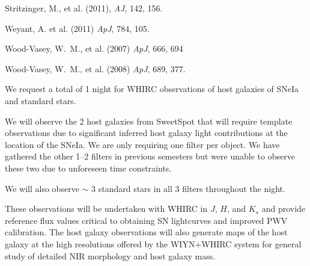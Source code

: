 \documentclass[11pt]{article}
\begin{document}
\begin{thebibliography}{11}


{Stritzinger}, M., et al. (2011), {\it AJ}, 142, 156.


Weyant, A. et al. (2011) {\it ApJ}, 784, 105.

{Wood-Vasey}, W.~M., et al. (2007) {\it ApJ}, 666, 694

Wood-Vasey, W.~M., et al. (2008) {\it ApJ}, 689, 377.



\end{thebibliography}

\clearpage


%

%

\expdesign

We request a total of 1 night for WHIRC observations of host galaxies of SNeIa and standard stars.  

We will observe the 2 host galaxies from SweetSpot that will
require template observations due to significant inferred host galaxy light contributions at the location of the SNeIa.
We are only requiring one filter per object. 
We have gathered the other 1--2 filters in previous semesters but were unable to observe these two due to unforeseen time constraints. 

We will also observe $\sim$ 3 standard stars in all 3 filters throughout the night.

These observations will be undertaken with WHIRC in $J$, $H$, and $K_s$
and provide reference flux values critical to obtaining
SN lightcurves and improved PWV calibration.  
The host galaxy observations will also generate
maps of the host galaxy at the high resolutions offered by the WIYN+WHIRC system for general study of detailed NIR morphology and host galaxy mass.
\end{document}
